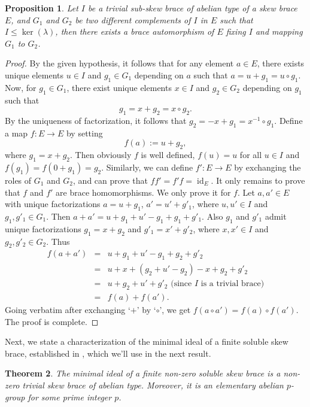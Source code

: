 \documentclass[11pt]{amsart}
\theoremstyle{thrm}
\theoremstyle{plain}
\newtheorem{thm}{Theorem}[section]
\newtheorem{prop}[thm]{Proposition}
\theoremstyle{definition}
\newcommand{\Id}{\operatorname{id}}
\newcommand{\Ker}{\operatorname{ker} }
\numberwithin{equation}{section}
\begin{document}
\begin{prop}
Let $I$ be  a trivial sub-skew brace  of abelian type of a skew brace $E$, and $G_1$ and $G_2$ be two different complements  of $I$ in $E$ such that $I \le \Ker(\lambda)$, then there exists a brace automorphism of $E$ fixing $I$ and mapping $G_1$ to $G_2$. 
\end{prop}
\begin{proof}
By the given hypothesis, it follows that  for any element $a \in E$, there exists  unique elements $u \in I$ and $g_1 \in G_1$ depending on $a$  such that $a = u + g_1 = u \circ g_1$. Now, for  $g_1 \in G_1$, there exist unique elements $x \in I$ and $g_2 \in G_2$ depending on $g_1$  such that 
$$g_1 = x + g_2 = x \circ g_2.$$ 
By the uniqueness of factorization, it follows that $g_2 = -x + g_1 = x^{-1} \circ g_1$.  Define a map $f: E \to E$ by setting
$$f(a) := u + g_2,$$
where $g_1 = x + g_2$. Then obviously $f$ is well defined, $f(u) =u$ for all $u \in I$ and $f(g_1) = f(0 + g_1) = g_2$. Similarly, we can define $f': E \to E$ by exchanging the roles of $G_1$ and $G_2$, and can prove that $f f' = f' f = \Id_E$. It only remains to prove that $f$ and $f'$ are brace homomorphisms. We only prove it for $f$. Let $a, a' \in E$ with unique factorizations  $a = u + g_1$, $a' = u' + g'_1$, where $u, u' \in I$ and $g_1, g'_1 \in G_1$. Then $a + a' = u + g_1 + u' - g_1 + g_1 + g'_1$. Also $g_1$ and $g'_1$ admit unique factorizations $g_1 = x + g_2$ and $g'_1 = x' + g'_2$, where $x, x' \in I$ and $g_2, g'_2 \in G_2$.  Thus 
\begin{eqnarray*}
f(a + a') &=& u + g_1 + u' - g_1 + g_2 + g'_2\\
&=& u + x + (g_2 + u' - g_2) - x   + g_2 + g'_2\\
&=&  u + g_2 + u' + g'_2 \mbox{ (since $I$ is a trivial brace)}\\
&=& f(a) + f(a').
\end{eqnarray*}
Going verbatim after exchanging `$+$' by `$\circ$', we get $f(a \circ a') = f(a) \circ f(a')$. The proof is complete.
\end{proof}

Next, we state a characterization of the minimal ideal of a finite soluble skew brace, established in \cite[Theorem~B]{BEJP24}, which we'll use in the next result.

\begin{thm}\label{minimumideal}
The minimal ideal of a finite non-zero soluble skew brace is a non-zero trivial skew brace of abelian type. Moreover, it is an elementary abelian \( p \)-group for some prime integer $p$.
\end{thm}
\end{document}
